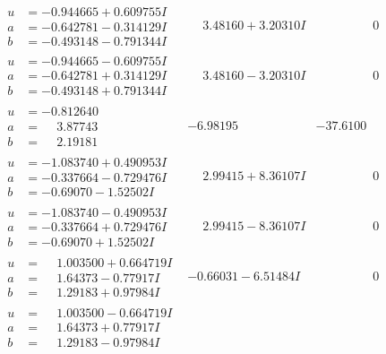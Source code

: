 \documentclass[1p]{elsarticle_modified}
\theoremstyle{definition}
\begin{document}
$$\begin{array}{c|c|c}
\begin{aligned}
u &= -0.944665 + 0.609755 I \\
a &= -0.642781 - 0.314129 I \\
b &= -0.493148 - 0.791344 I\end{aligned}
 & \phantom{-}3.48160 + 3.20310 I & \phantom{-0.000000 } 0 \\ \hline\begin{aligned}
u &= -0.944665 - 0.609755 I \\
a &= -0.642781 + 0.314129 I \\
b &= -0.493148 + 0.791344 I\end{aligned}
 & \phantom{-}3.48160 - 3.20310 I & \phantom{-0.000000 } 0 \\ \hline\begin{aligned}
u &= -0.812640\phantom{ +0.000000I} \\
a &= \phantom{-}3.87743\phantom{ +0.000000I} \\
b &= \phantom{-}2.19181\phantom{ +0.000000I}\end{aligned}
 & -6.98195\phantom{ +0.000000I} & -37.6100\phantom{ +0.000000I} \\ \hline\begin{aligned}
u &= -1.083740 + 0.490953 I \\
a &= -0.337664 - 0.729476 I \\
b &= -0.69070 - 1.52502 I\end{aligned}
 & \phantom{-}2.99415 + 8.36107 I & \phantom{-0.000000 } 0 \\ \hline\begin{aligned}
u &= -1.083740 - 0.490953 I \\
a &= -0.337664 + 0.729476 I \\
b &= -0.69070 + 1.52502 I\end{aligned}
 & \phantom{-}2.99415 - 8.36107 I & \phantom{-0.000000 } 0 \\ \hline\begin{aligned}
u &= \phantom{-}1.003500 + 0.664719 I \\
a &= \phantom{-}1.64373 - 0.77917 I \\
b &= \phantom{-}1.29183 + 0.97984 I\end{aligned}
 & -0.66031 - 6.51484 I & \phantom{-0.000000 } 0 \\ \hline\begin{aligned}
u &= \phantom{-}1.003500 - 0.664719 I \\
a &= \phantom{-}1.64373 + 0.77917 I \\
b &= \phantom{-}1.29183 - 0.97984 I\end{aligned}

\end{array}$$
\end{document}
